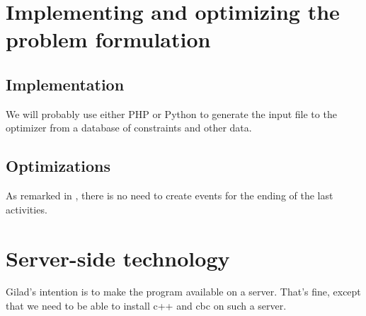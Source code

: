 \documentclass[11pt,reqno]{amsart}
\numberwithin{equation}{section}
\begin{document}
\section{Implementing and optimizing the problem formulation}

\subsection{Implementation}

We will probably use either PHP or Python to generate the input file to the optimizer from
a database of constraints and other data.

\subsection{Optimizations}
As remarked in \cite{artigues-etal11}, there is no need to create
events for the ending of the last activities. 

\section{Server-side technology}

Gilad's intention is to make the program available on a server. That's
fine, except that we need to be able to install c++ and cbc on such a server.



\end{document}
